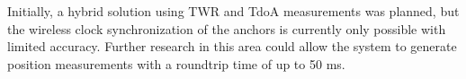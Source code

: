 \documentclass[conference, a4paper]{IEEEtran}
\begin{document}
Initially, a hybrid solution using \ac{TWR} and \ac{TdoA} measurements was planned,
but the wireless clock synchronization of the anchors is currently only possible with limited accuracy.
Further research in this area could allow the system to generate position measurements with a roundtrip time of up to 50 ms.




 
\end{document}
